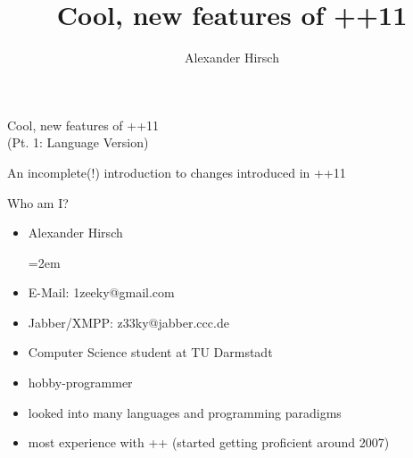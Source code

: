 


\author{Alexander Hirsch}

	\title{Cool, new features of \C++11}
	\subtitle{\insertauthor}
	
	\begin{frame}
		\begin{center}
			{\Huge  Cool, new features of \C++11 \\}
			{\LARGE (Pt. 1: Language Version)}
			
			\emptyline
			{\Large An incomplete(!) introduction to changes introduced in \C++11}
		\end{center}
		
	\end{frame}
	
	\begin{frame}{Who am I?}
		\begin{itemize}
			\item Alexander Hirsch
				
			\leftskip=2em
				\item E-Mail: 1zeeky@gmail.com
				\item Jabber/XMPP: z33ky@jabber.ccc.de
				
			\leftskip=0pt
			
			\emptyline
			\item Computer Science student at TU Darmstadt
			\item hobby-programmer
			\emptyline
			\item looked into many languages and programming paradigms
			\item most experience with \C++ (started getting proficient around 2007)
		\end{itemize}
	\end{frame}
		
